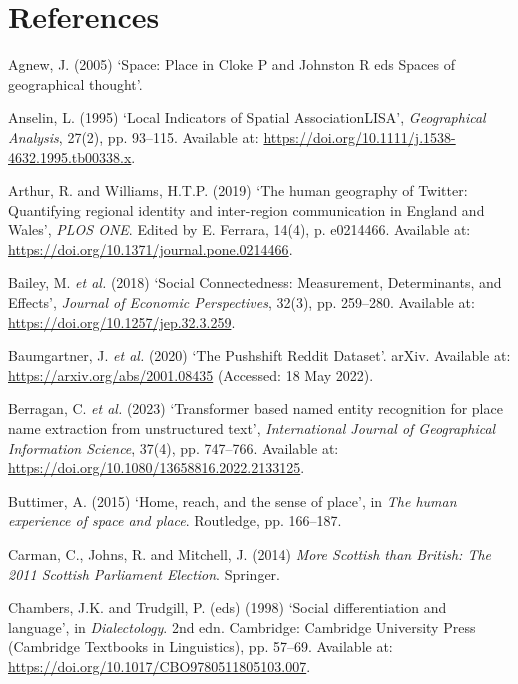 \documentclass[
]{article}
\newlength{\cslhangindent}
\newenvironment{CSLReferences}[2] %
 {\begin{list}{}{%
  \setlength{\itemindent}{0pt}
  \setlength{\leftmargin}{0pt}
  \setlength{\parsep}{0pt}
  \ifodd #1
   \setlength{\leftmargin}{\cslhangindent}
   \setlength{\itemindent}{-1\cslhangindent}
  \fi
  \setlength{\itemsep}{#2\baselineskip}}}
 {\end{list}}
\begin{document}
\section*{References}\label{references}

\label{refs}
\begin{CSLReferences}{0}{1}
Agnew, J. (2005) {`Space: Place in {Cloke P} and {Johnston R} eds
{Spaces} of geographical thought'}.

Anselin, L. (1995) {`Local {Indicators} of {Spatial
Association}{\textemdash}{LISA}'}, \emph{Geographical Analysis}, 27(2),
pp. 93--115. Available at:
\url{https://doi.org/10.1111/j.1538-4632.1995.tb00338.x}.

Arthur, R. and Williams, H.T.P. (2019) {`The human geography of
{Twitter}: {Quantifying} regional identity and inter-region
communication in {England} and {Wales}'}, \emph{PLOS ONE}. Edited by E.
Ferrara, 14(4), p. e0214466. Available at:
\url{https://doi.org/10.1371/journal.pone.0214466}.

Bailey, M. \emph{et al.} (2018) {`Social {Connectedness}: {Measurement},
{Determinants}, and {Effects}'}, \emph{Journal of Economic
Perspectives}, 32(3), pp. 259--280. Available at:
\url{https://doi.org/10.1257/jep.32.3.259}.

Baumgartner, J. \emph{et al.} (2020) {`The {Pushshift Reddit Dataset}'}.
{arXiv}. Available at: \url{https://arxiv.org/abs/2001.08435} (Accessed:
18 May 2022).

Berragan, C. \emph{et al.} (2023) {`Transformer based named entity
recognition for place name extraction from unstructured text'},
\emph{International Journal of Geographical Information Science}, 37(4),
pp. 747--766. Available at:
\url{https://doi.org/10.1080/13658816.2022.2133125}.

Buttimer, A. (2015) {`Home, reach, and the sense of place'}, in
\emph{The human experience of space and place}. {Routledge}, pp.
166--187.

Carman, C., Johns, R. and Mitchell, J. (2014) \emph{More {Scottish} than
{British}: {The} 2011 {Scottish Parliament Election}}. {Springer}.

Chambers, J.K. and Trudgill, P. (eds) (1998) {`Social differentiation
and language'}, in \emph{Dialectology}. 2nd edn. {Cambridge}: {Cambridge
University Press} (Cambridge {Textbooks} in {Linguistics}), pp. 57--69.
Available at: \url{https://doi.org/10.1017/CBO9780511805103.007}.


\end{CSLReferences}
\end{document}

